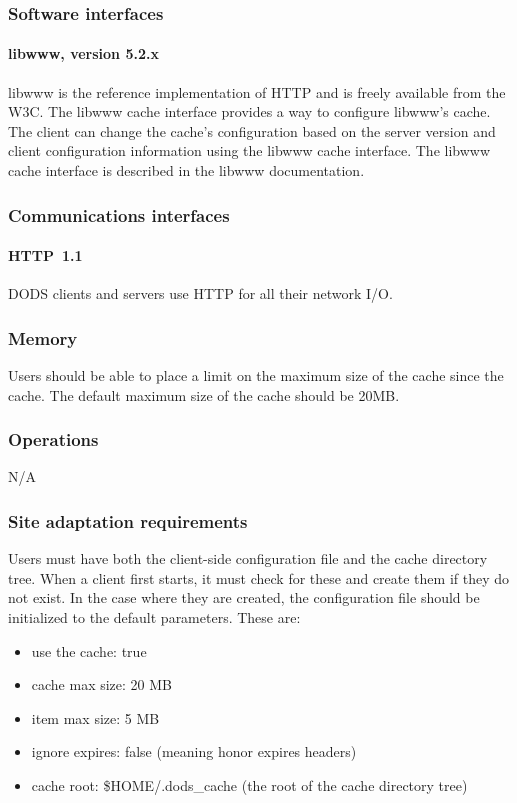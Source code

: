 \documentclass{article}
\begin{document}
\subsubsection{Software interfaces}
\paragraph{libwww, version 5.2.x}
libwww is the reference implementation of HTTP and is freely available from
the \ac{W3C}. The libwww cache interface provides a way to configure libwww's
cache. The client can change the cache's configuration based on the server
version and client configuration information using the libwww cache
interface. The libwww cache interface is described in the libwww
documentation.

\subsubsection{Communications interfaces}
\paragraph{HTTP~1.1} DODS clients and servers use HTTP for all their network
I/O.

\subsubsection{Memory}
Users should be able to place a limit on the maximum size of the cache since
the cache. The default maximum size of the cache should be 20MB.

\subsubsection{Operations}
N/A

\subsubsection{Site adaptation requirements}
Users must have both the client-side configuration file and the cache
directory tree. When a client first starts, it must check for these and
create them if they do not exist. In the case where they are created, the
configuration file should be initialized to the default parameters. These
are:
\begin{itemize}
\item use the cache: true
\item cache max size: 20 MB
\item item max size: 5 MB
\item ignore expires: false (meaning honor expires headers)
\item cache root: \$HOME/.dods\_cache (the root of the cache directory tree)
\end{itemize}
\end{document}
